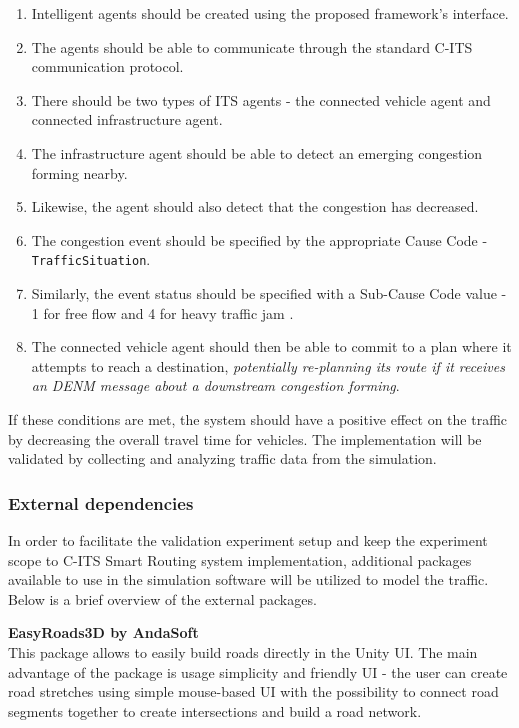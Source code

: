 \documentclass[main.tex]{subfiles}
\begin{document}
\begin{enumerate}
    \item Intelligent agents should be created using the proposed framework's interface.
    \item The agents should be able to communicate through the standard C-ITS communication protocol.
    \item There should be two types of ITS agents - the connected vehicle agent and connected infrastructure agent.
    \item The infrastructure agent should be able to detect an emerging congestion forming nearby.
    \item Likewise, the agent should also detect that the congestion has decreased.
    \item The congestion event should be specified by the appropriate Cause Code - \texttt{TrafficSituation}.
    \item Similarly, the event status should be specified with a Sub-Cause Code value - 1 for
    free flow and 4 for heavy traffic jam \cite{ETSI2019}. 
    \item The connected vehicle agent should then be able to commit to a plan where it attempts to reach a
    destination, \emph{potentially re-planning its route if it receives an DENM message about a downstream congestion forming}.
 \end{enumerate}

If these conditions are met, the system should have a positive effect on the traffic by decreasing the overall 
travel time for vehicles. The implementation will be validated by collecting and analyzing traffic data from 
the simulation.

\subsubsection{External dependencies}

In order to facilitate the validation experiment setup and keep the experiment scope to C-ITS
Smart Routing system implementation, additional packages available to use in the simulation
software will be utilized to model the traffic. Below is a brief overview of the external packages.

\textbf{EasyRoads3D by AndaSoft} \smallskip \\
This package allows to easily build roads directly in the Unity UI. The main advantage of the 
package is usage simplicity and friendly UI - the user can create road stretches using simple
mouse-based UI with the possibility to connect road segments together to create intersections
and build a road network.
\end{document}
